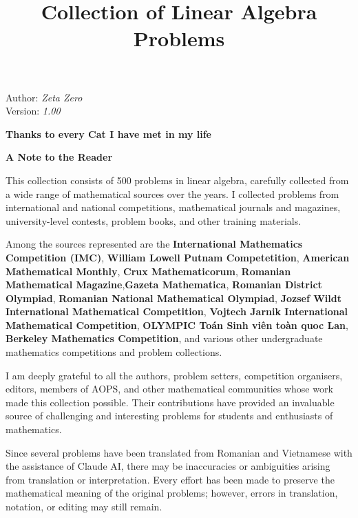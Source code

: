 \documentclass[12pt]{article}
\title{\Huge\bfseries{Collection of Linear Algebra Problems}}
\author{}
\date{}
\begin{document}
\maketitle

\begin{center}
	\small Author: \textit{Zeta Zero}\\
	\small Version: \textit{1.00}
\end{center} 

\newpage
\begin{center}
	\vspace*{\fill}
	
	\textbf{Thanks to every Cat I have met in my life}
	
	
	\vspace*{\fill}
	
	
\end{center}

\newpage

\begin{center}
{\LARGE\bfseries A Note to the Reader}
\end{center}

This collection consists of 500 problems in linear algebra, carefully collected from a wide range of mathematical sources over the years. I collected problems from international and national competitions, mathematical journals and magazines, university-level contests, problem books, and other training materials.

Among the sources represented are the \textbf{International Mathematics Competition (IMC)}, \textbf{William Lowell Putnam Competetition}, \textbf{American Mathematical Monthly}, \textbf{Crux Mathematicorum}, \textbf{Romanian Mathematical Magazine},\textbf{Gazeta Mathematica}, \textbf{Romanian District Olympiad}, \textbf{Romanian National Mathematical Olympiad}, \textbf{Jozsef Wildt International Mathematical Competition}, \textbf{Vojtech Jarnik International Mathematical Competition}, \textbf{OLYMPIC Toán Sinh viên toàn quoc Lan}, \textbf{Berkeley Mathematics Competition}, and various other undergraduate mathematics competitions and problem collections.

I am deeply grateful to all the authors, problem setters, competition organisers, editors, members of AOPS, and other mathematical communities whose work made this collection possible. Their contributions have provided an invaluable source of challenging and interesting problems for students and enthusiasts of mathematics.

Since several problems have been translated from Romanian and Vietnamese with the assistance of Claude AI, there may be inaccuracies or ambiguities arising from translation or interpretation. Every effort has been made to preserve the mathematical meaning of the original problems; however, errors in translation, notation, or editing may still remain.
\medskip
\end{document}
